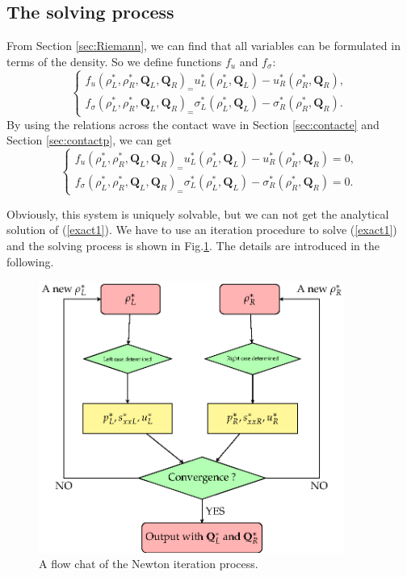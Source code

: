 \documentclass[review]{elsarticle}
\numberwithin{equation}{section}
\numberwithin{table}{section}
\begin{document}
  \subsection{The solving process}\label{sec:iteration}
From Section  \ref{sec:Riemann}, we can find that all variables can be formulated in terms of the  density. So we define functions $f_u$ and $f_\sigma$: 
\begin{equation} 
\left\{
\begin{array}{c}
  f_u(\rho_L^*,\rho_R^*,\mathbf{Q}_{L},\mathbf{Q}_{R})_=  u_L^*(\rho_L^*,\mathbf{Q}_{L}) -u_R^*(\rho_R^*,\mathbf{Q}_{R}), \\
  f_\sigma(\rho_L^*,\rho_R^*,\mathbf{Q}_{L},\mathbf{Q}_{R})_=  \sigma_L^*(\rho_L^*,\mathbf{Q}_{L}) -\sigma_R^*(\rho_R^*,\mathbf{Q}_{R}).
\end{array}
\right.
\end{equation}
By using the relations across the contact wave in Section \ref{sec:contacte} and Section \ref{sec:contactp}, we can get
\begin{equation} \label{exact1}
\left\{
\begin{array}{c}
  f_u(\rho_L^*,\rho_R^*,\mathbf{Q}_{L},\mathbf{Q}_{R})_=  u_L^*(\rho_L^*,\mathbf{Q}_{L}) -u_R^*(\rho_R^*,\mathbf{Q}_{R})=0, \\
  f_\sigma(\rho_L^*,\rho_R^*,\mathbf{Q}_{L},\mathbf{Q}_{R})_=  \sigma_L^*(\rho_L^*,\mathbf{Q}_{L}) -\sigma_R^*(\rho_R^*,\mathbf{Q}_{R})=0.
\end{array}
\right.
\end{equation}

Obviously, this system is uniquely solvable, but we can not get the analytical solution of (\ref{exact1}). We have to use an iteration procedure to solve (\ref{exact1}) and
the solving process is shown in Fig.\ref{fig:newton}. The details are introduced in the following.

\begin{figure}
  \centering
 \includegraphics[width= 10cm] {Tikz-figure6.eps}
  \caption{A flow chat of the Newton iteration process.}
  \label{fig:newton}
\end{figure}
\end{document}
